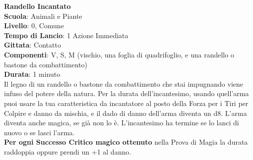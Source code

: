 \begin{multicols}{2}
\medskip\textbf{Randello Incantato}\\
\textbf{Scuola}: Animali e Piante\\
\textbf{Livello}: 0, Comune\\
\textbf{Tempo di Lancio}: 1 Azione Immediata\\
\textbf{Gittata}: Contatto\\
\textbf{Componenti}: V, S, M (vischio, una foglia di quadrifoglio, e una randello o bastone da combattimento)\\
\textbf{Durata}: 1 minuto\\
Il legno di un randello o bastone da combattimento che stai impugnando viene infuso del potere della natura. Per la durata dell'incantesimo, usando quell'arma puoi usare la tua caratteristica da incantatore al posto della Forza per i Tiri per Colpire e danno da mischia, e il dado di danno dell'arma diventa un d8. L'arma diventa anche magica, se già non lo è. L'incantesimo ha termine se lo lanci di nuovo o se lasci l'arma.\\
\textbf{Per ogni Successo Critico magico ottenuto} nella Prova di Magia la durata raddoppia oppure prendi un +1 al danno.


\end{multicols}
